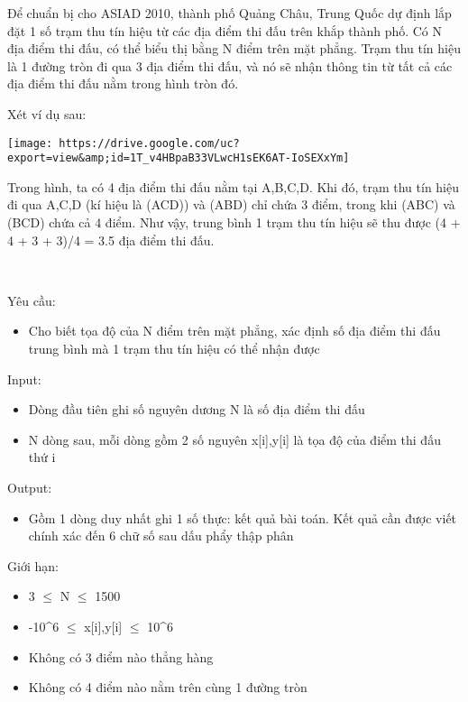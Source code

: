 

Để chuẩn bị cho ASIAD 2010, thành phố Quảng Châu, Trung Quốc dự định lắp đặt 1 số trạm thu tín hiệu từ các địa điểm thi đấu trên khắp thành phố. Có N địa điểm thi đấu, có thể biểu thị bằng N điểm trên mặt phẳng. Trạm thu tín hiệu là 1 đường tròn đi qua 3 địa điểm thi đấu, và nó sẽ nhận thông tin từ tất cả các địa điểm thi đấu nằm trong hình tròn đó.

Xét ví dụ sau:


\texttt{[image: https://drive.google.com/uc?export=view\&amp;id=1T\_v4HBpaB33VLwcH1sEK6AT-IoSEXxYm]}

Trong hình, ta có 4 địa điểm thi đấu nằm tại A,B,C,D. Khi đó, trạm thu tín hiệu đi qua A,C,D (kí hiệu là (ACD)) và (ABD) chỉ chứa 3 điểm, trong khi (ABC) và (BCD) chứa cả 4 điểm. Như vậy, trung bình 1 trạm thu tín hiệu sẽ thu được (4 + 4 + 3 + 3)/4 = 3.5 địa điểm thi đấu.

 

Yêu cầu:
\begin{itemize}
	\item 

Cho biết tọa độ của N điểm trên mặt phẳng, xác định số địa điểm thi đấu trung bình mà 1 trạm thu tín hiệu có thể nhận được
\end{itemize}

Input:
\begin{itemize}
	\item 

Dòng đầu tiên ghi số nguyên dương N là số địa điểm thi đấu
	\item 

N dòng sau, mỗi dòng gồm 2 số nguyên x[i],y[i] là tọa độ của điểm thi đấu thứ i
\end{itemize}

Output:
\begin{itemize}
	\item 

Gồm 1 dòng duy nhất ghi 1 số thực: kết quả bài toán. Kết quả cần được viết chính xác đến 6 chữ số sau dấu phẩy thập phân
\end{itemize}

Giới hạn:
\begin{itemize}
	\item 

3  $\le$  N  $\le$  1500
	\item 

-10^6  $\le$  x[i],y[i]  $\le$  10^6
	\item 

Không có 3 điểm nào thẳng hàng
	\item 

Không có 4 điểm nào nằm trên cùng 1 đường tròn
\end{itemize}

